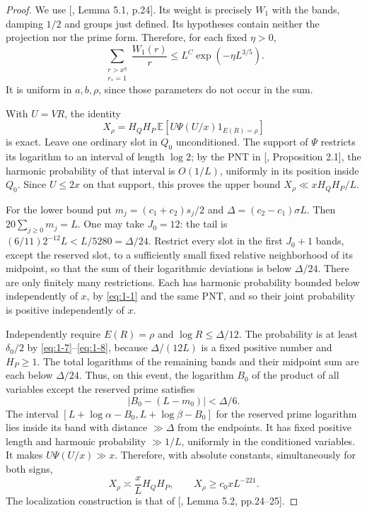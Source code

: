 \documentclass[11pt]{article}
\theoremstyle{definition}
\theoremstyle{definition}
\begin{document}
\begin{proof}
We use [, Lemma 5.1, p.24]. Its weight is precisely \(W_1\) with the bands, damping \(1/2\) and groups just defined. Its hypotheses contain neither the projection nor the prime form. Therefore, for each fixed \(\eta>0\),
\begin{equation}
\sum_{\substack{r>x^\eta\\r_*=1}}\frac{W_1(r)}r
 \le L^C\exp(-\eta L^{3/5}).                             \tag{1.8}\label{eq:1-8}
\end{equation}
It is uniform in \(a,b,\rho\), since those parameters do not occur in the sum.

With \(U=VR\), the identity
\begin{equation*}
X_\rho=H_QH_P\,\mathbb E[U\Psi(U/x)1_{E(R)=\rho}]
\end{equation*}
is exact. Leave one ordinary slot in \(Q_0\) unconditioned. The support of \(\Psi\) restricts its logarithm to an interval of length \(\log2\); by the PNT in [, Proposition 2.1], the harmonic probability of that interval is \(O(1/L)\), uniformly in its position inside \(Q_0\). Since \(U\le2x\) on that support, this proves the upper bound \(X_\rho\ll xH_QH_P/L\).

For the lower bound put \(m_j=(c_1+c_2)s_j/2\) and \(\Delta=(c_2-c_1)\sigma L\). Then \(20\sum_{j\ge0}m_j=L\). One may take \(J_0=12\): the tail is \((6/11)2^{-12}L<L/5280=\Delta/24\). Restrict every slot in the first \(J_0+1\) bands, except the reserved slot, to a sufficiently small fixed relative neighborhood of its midpoint, so that the sum of their logarithmic deviations is below \(\Delta/24\). There are only finitely many restrictions. Each has harmonic probability bounded below independently of \(x\), by \eqref{eq:1-1} and the same PNT, and so their joint probability is positive independently of \(x\).

Independently require \(E(R)=\rho\) and \(\log R\le\Delta/12\). The probability is at least \(\delta_0/2\) by \eqref{eq:1-7}--\eqref{eq:1-8}, because \(\Delta/(12L)\) is a fixed positive number and \(H_P\ge1\). The total logarithms of the remaining bands and their midpoint sum are each below \(\Delta/24\). Thus, on this event, the logarithm \(B_0\) of the product of all variables except the reserved prime satisfies
\begin{equation*}
|B_0-(L-m_0)|<\Delta/6.
\end{equation*}
The interval
\([L+\log\alpha-B_0,L+\log\beta-B_0]\)
for the reserved prime logarithm lies inside its band with distance \(\gg\Delta\) from the endpoints. It has fixed positive length and harmonic probability \(\gg1/L\), uniformly in the conditioned variables. It makes \(U\Psi(U/x)\gg x\). Therefore, with absolute constants, simultaneously for both signs,
\begin{equation}
X_\rho\asymp\frac{x}{L}H_QH_P,\qquad
 X_\rho\ge c_0xL^{-221}.                                \tag{1.9}\label{eq:1-9}
\end{equation}
The localization construction is that of [, Lemma 5.2, pp.24--25].

\end{proof}
\end{document}
